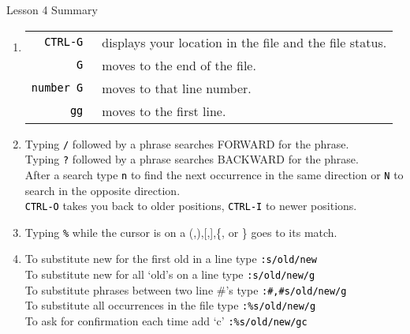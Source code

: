 \documentclass[handout, 10pt]{beamer}
\newcommand{\code}[2][black]{\textcolor{#1}{\colorbox{codegray}{\texttt{#2}}}}
\begin{document}
\begin{frame}{Lesson 4 Summary}
	\begin{enumerate}
		\item
			\begin{tabular}[t]{rl}
				\code{CTRL-G} & ~displays your location in the file and the
				file status. \\
				\code{G} & ~moves to the end of the file. \\
				\code{number G} & ~moves to that line number.\\
				\code{gg} & ~moves to the first line.
			\end{tabular}

		\item Typing \code{/} followed by a phrase searches FORWARD for the
			phrase.	\\
			Typing \code{?} followed by a phrase searches BACKWARD for the
			phrase. \\
			After a search type \code{n} to find the next occurrence in the
			same direction or \code{N} to search in the opposite direction. \\
			\code{CTRL-O} takes you back to older positions, \code{CTRL-I} to
			newer positions.

		\item Typing  \code{\%}  while the cursor is on a (,),[,],\{, or \}
			goes to its match.

		\item To substitute new for the first old in a line type
			\code{:s/old/new} \\
			To substitute new for all `old's on a line type \code{:s/old/new/g}
			\\
			To substitute phrases between two line \#'s type
			\code{:\#,\#s/old/new/g} \\
			To substitute all occurrences in the file type
			\code{:\%s/old/new/g} \\
			To ask for confirmation each time add `c' \code{:\%s/old/new/gc}
	\end{enumerate}
\end{frame}
\end{document}
